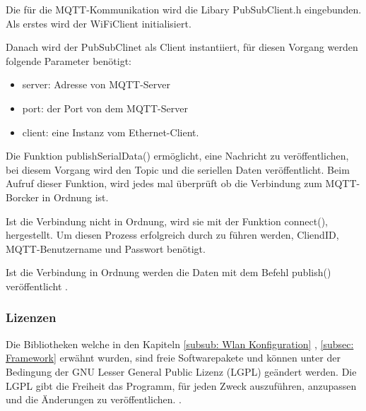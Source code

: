 Die für die MQTT-Kommunikation wird die Libary PubSubClient.h eingebunden. Als erstes wird der WiFiClient initialisiert. 

Danach wird der PubSubClinet als Client instantiiert, für diesen Vorgang werden folgende Parameter benötigt:\\
\begin{itemize}
\item 	server: Adresse von MQTT-Server\\
\item 	port: der Port von dem MQTT-Server\\
\item 	client: eine Instanz vom Ethernet-Client.\\
\end{itemize}
Die Funktion publishSerialData() ermöglicht, eine Nachricht zu veröffentlichen, bei diesem Vorgang wird den Topic und die seriellen Daten veröffentlicht. Beim Aufruf dieser Funktion, wird jedes mal überprüft ob die Verbindung zum MQTT-Borcker in Ordnung ist. 

Ist die Verbindung nicht in Ordnung, wird sie mit der Funktion connect(), hergestellt. Um diesen Prozess erfolgreich durch zu führen werden, CliendID, MQTT-Benutzername und Passwort benötigt.

Ist die Verbindung in Ordnung werden die Daten mit dem Befehl publish() veröffentlicht \cite{noauthor_arduino_nodate-1}.

\subsubsection{Lizenzen}
Die Bibliotheken welche in den Kapiteln \ref{subsub: Wlan Konfiguration} , \ref{subsec: Framework} erwähnt wurden, sind freie Softwarepakete und können unter der Bedingung der GNU Lesser General Public Lizenz (LGPL) geändert werden. Die LGPL gibt die Freiheit das Programm, für jeden Zweck auszuführen, anzupassen und die Änderungen zu veröffentlichen. \cite{noauthor_gnu.org_nodate}.
 
